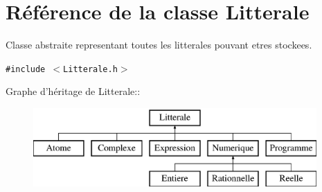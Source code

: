 \hypertarget{class_litterale}{
\section{Référence de la classe Litterale}
\label{class_litterale}
}
Classe abstraite representant toutes les litterales pouvant etres stockees.  


{\tt \#include $<$Litterale.h$>$}

Graphe d'héritage de Litterale::\begin{figure}[H]
\begin{center}
\leavevmode
\includegraphics[height=3cm]{class_litterale}
\end{center}
\end{figure}
